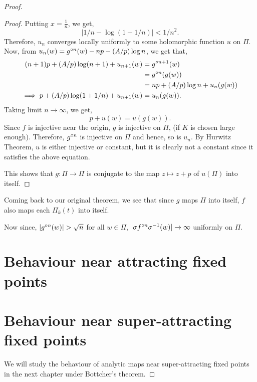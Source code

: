 \begin{proof}
\begin{proof}
Putting \( x=\frac{1}{n} \), we get, \[
	|1 /n-\log (1+ 1 /n)|<1 /n^2
.\] 
Therefore, \( u_n\) converges locally uniformly to some holomorphic function \( u \) on \( \Pi \).\\
Now, from \( u_n(w)=\gog[n](w)-np-(A /p)\log n \), we get that, 
\begin{align*}
	(n+1)p+(A /p)\log (n+1)+u_{n+1}(w)&=\gog[n+1](w)\\
									  &=\gog[n](g(w))\\
									  &=np+(A /p)\log n+u_n(g(w))\\
	\implies p+(A /p)\log (1+1 /n)+u_{n+1}(w)&=u_n(g(w))
.\end{align*}
Taking limit \( n\to \infty \), we get, \[
	p+u(w)=u(g(w))
.\] 
Since \( f \) is injective near the origin, \( g \) is injective on \( \Pi \),
(if \( K \) is chosen large enough). Therefore, \( \gog[n] \) is injective on \( \Pi \)
and hence, so is \( u_n \). By Hurwitz Theorem, \( u \) is either injective or constant, but it
is clearly not a constant since it satisfies the above equation.

This shows that \( g:\Pi\to \Pi \) is conjugate to the map \( z\mapsto z+p \) of \( u(\Pi) \) into
itself.
\end{proof}

Coming back to our original theorem, we see that since \( g \) maps \( \Pi \) into itself, \( f\)
also maps each \( \Pi_k(t) \) into itself.

Now since, \( |\gog[n](w)|>\sqrt{n}  \) for all \( w\in\Pi \), 
\( |\sigma \fof[n]\sigma^{-1}(w)|\to \infty \)
uniformly on \( \Pi \).

\section{Behaviour near attracting fixed points}

\section{Behaviour near super-attracting fixed points}
We will study the behaviour of analytic maps near super-attracting fixed
points in the next chapter under Bottcher's theorem.

\end{proof}
